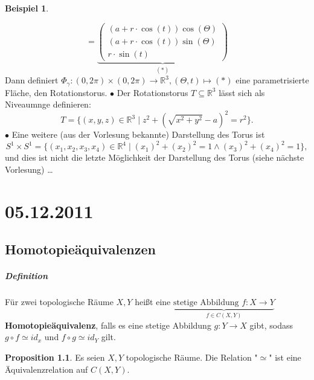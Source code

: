 \documentclass[a4paper,11pt,notitlepage]{report}
\theoremstyle{definition}
\newtheorem{proposition}{Proposition}[chapter]
\newtheorem{example}{Beispiel}[chapter]
\newcommand{\R}{{\ensuremath{\mathbb{R}}}}
\begin{document}
\begin{example}
\begin{enumerate}
	$$= \underbrace{\begin{pmatrix}
	(a + r \cdot \cos{(t)})  \cos{(\Theta)} \\ (a + r \cdot \cos{(t)})  \sin{(\Theta)} \\ r \cdot \sin{(t)}
	\end{pmatrix} }_{(*)}$$
	Dann definiert $\Phi_\gamma \colon (0, 2\pi) \times (0, 2 \pi) \rightarrow \R^3, (\Theta, t) \mapsto (*)$
	eine parametrisierte Fläche, den Rotationstorus.
	\newline
	$\bullet$ Der Rotationstorus $T \subseteq \R^3$ lässt sich als Niveaumnge definieren: 
	$$T = \{(x,y,z) \in \R^3 \mid z^2 + (\sqrt{x^2+y^2}-a)^2 = r^2\}.$$
	$\bullet$ Eine weitere (aus der Vorlesung bekannte) Darstellung des Torus ist
	$$S^1 \times S^1 = \{(x_1,x_2,x_3,x_4) \in \R^4 \mid (x_1)^2 + (x_2)^2 = 1 \wedge (x_3)^2 + (x_4)^2 = 1 \},$$
	und dies ist nicht die letzte Möglichkeit der Darstellung des Torus (siehe nächste Vorlesung) \ldots 
	\end{enumerate}
\end{example}

\chapter{05.12.2011}
\section{Homotopieäquivalenzen}
\paragraph{Definition}
Für zwei topologische Räume $X,Y$ heißt eine $\underbrace{\text{stetige Abbildung }f \colon X \rightarrow Y}_{f \in C(X,Y)}$ \textbf{Homotopieäquivalenz}, falls es eine stetige Abbildung $g \colon Y \rightarrow X$ gibt, sodass $g \circ f \simeq id_x$ und $f \circ g \simeq id_Y$ gilt.

\begin{proposition}
	Es seien $X,Y$ topologische Räume. Die Relation "$\simeq$" ist eine Äquivalenzrelation auf $C(X,Y)$.
\end{proposition}
\end{document}
